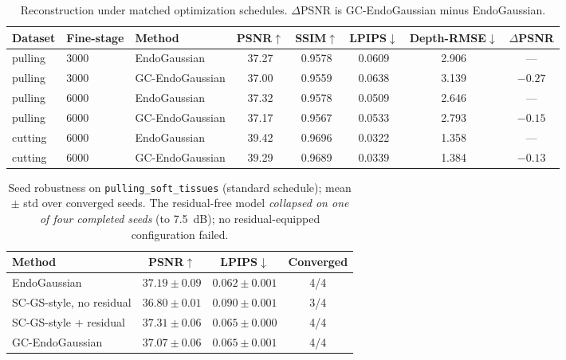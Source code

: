 \documentclass[ASNA,twocolumn]{USG} %
\begin{document}
\begin{table}[t]%
\centering
\caption{Reconstruction under matched optimization schedules. $\Delta$PSNR is GC-EndoGaussian minus EndoGaussian.\label{tab:recon}}%
\begin{tabular*}{\textwidth}{@{\extracolsep\fill}lllccccc@{\extracolsep\fill}}
\toprule
\textbf{Dataset} & \textbf{Fine-stage} & \textbf{Method} & \textbf{PSNR}$\uparrow$ & \textbf{SSIM}$\uparrow$ & \textbf{LPIPS}$\downarrow$ & \textbf{Depth-RMSE}$\downarrow$ & \textbf{$\Delta$PSNR} \\
\midrule
pulling & 3000 & EndoGaussian     & 37.27 & 0.9578 & 0.0609 & 2.906 & --- \\
pulling & 3000 & GC-EndoGaussian  & 37.00 & 0.9559 & 0.0638 & 3.139 & $-0.27$ \\
pulling & 6000 & EndoGaussian     & 37.32 & 0.9578 & 0.0509 & 2.646 & --- \\
pulling & 6000 & GC-EndoGaussian  & 37.17 & 0.9567 & 0.0533 & 2.793 & $-0.15$ \\
cutting & 6000 & EndoGaussian     & 39.42 & 0.9696 & 0.0322 & 1.358 & --- \\
cutting & 6000 & GC-EndoGaussian  & 39.29 & 0.9689 & 0.0339 & 1.384 & $-0.13$ \\
\bottomrule
\end{tabular*}
\end{table}

\begin{table}[t]%
\centering
\caption{Seed robustness on \texttt{pulling\_soft\_tissues} (standard schedule); mean $\pm$ std over converged seeds. The residual-free model \emph{collapsed on one of four completed seeds} (to 7.5~dB); no residual-equipped configuration failed.\protect\footnotemark\label{tab:seeds}}%
\begin{tabular*}{\textwidth}{@{\extracolsep\fill}lccc@{\extracolsep\fill}}
\toprule
\textbf{Method} & \textbf{PSNR}$\uparrow$ & \textbf{LPIPS}$\downarrow$ & \textbf{Converged} \\
\midrule
EndoGaussian             & $37.19 \pm 0.09$ & $0.062 \pm 0.001$ & 4/4 \\
SC-GS-style, no residual & $36.80 \pm 0.01$ & $0.090 \pm 0.001$ & 3/4 \\
SC-GS-style + residual   & $37.31 \pm 0.06$ & $0.065 \pm 0.000$ & 4/4 \\
GC-EndoGaussian          & $37.07 \pm 0.06$ & $0.065 \pm 0.001$ & 4/4 \\
\bottomrule
\end{tabular*}
\end{table}
\end{document}
